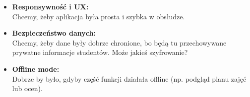 \begin{itemize}
	      \newpage

	\item \textbf{Responsywność i UX:}
	      \\Chcemy, żeby aplikacja była prosta i szybka w obsłudze.
	\item \textbf{Bezpieczeństwo danych: }
	      \\Chcemy, żeby dane były dobrze chronione, bo będą tu przechowywane prywatne informacje studentów. Może jakieś szyfrowanie?
	\item \textbf{Offline mode: }
	      \\Dobrze by było, gdyby część funkcji działała offline (np. podgląd planu zajęć lub ocen).
\end{itemize}
